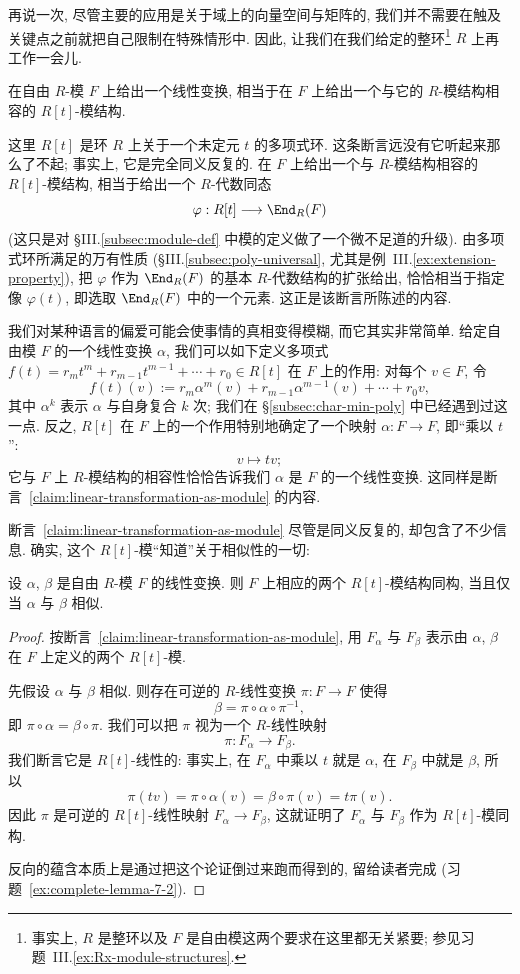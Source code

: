 再说一次, 尽管主要的应用是关于域上的向量空间与矩阵的, 我们并不需要在触及关键点之前就把自己限制在特殊情形中. 因此, 让我们在我们给定的整环\footnote{事实上, $R$ 是整环以及 $F$ 是自由模这两个要求在这里都无关紧要; 参见习题~III.\ref{ex:Rx-module-structures}.} $R$ 上再工作一会儿.

\begin{claim}\label{claim:linear-transformation-as-module}
在自由 $R$-模 $F$ 上给出一个线性变换, 相当于在 $F$ 上给出一个与它的 $R$-模结构相容的 $R[t]$-模结构.
\end{claim}

这里 $R[t]$ 是环 $R$ 上关于一个未定元 $t$ 的多项式环. 这条断言远没有它听起来那么了不起; 事实上, 它是完全同义反复的. 在 $F$ 上给出一个与 $R$-模结构相容的 $R[t]$-模结构, 相当于给出一个 $R$-代数同态
\[
\varphi:R[t]\longrightarrow\End_R(F)
\]
(这只是对 §III.\ref{subsec:module-def} 中模的定义做了一个微不足道的升级). 由多项式环所满足的万有性质 (§III.\ref{subsec:poly-universal}, 尤其是例~III.\ref{ex:extension-property}), 把 $\varphi$ 作为 $\End_R(F)$ 的基本 $R$-代数结构的扩张给出, 恰恰相当于指定像 $\varphi(t)$, 即选取 $\End_R(F)$ 中的一个元素. 这正是该断言所陈述的内容.

我们对某种语言的偏爱可能会使事情的真相变得模糊, 而它其实非常简单. 给定自由模 $F$ 的一个线性变换 $\alpha$, 我们可以如下定义多项式 $f(t)=r_mt^m+r_{m-1}t^{m-1}+\cdots+r_0\in R[t]$ 在 $F$ 上的作用: 对每个 $v\in F$, 令
\[
f(t)(v):=r_m\alpha^m(v)+r_{m-1}\alpha^{m-1}(v)+\cdots+r_0v,
\]
其中 $\alpha^k$ 表示 $\alpha$ 与自身复合 $k$ 次; 我们在 §\ref{subsec:char-min-poly} 中已经遇到过这一点. 反之, $R[t]$ 在 $F$ 上的一个作用特别地确定了一个映射 $\alpha:F\to F$, 即``乘以 $t$'':
\[
v\longmapsto tv;
\]
它与 $F$ 上 $R$-模结构的相容性恰恰告诉我们 $\alpha$ 是 $F$ 的一个线性变换. 这同样是断言~\ref{claim:linear-transformation-as-module} 的内容.

断言~\ref{claim:linear-transformation-as-module} 尽管是同义反复的, 却包含了不少信息. 确实, 这个 $R[t]$-模``知道''关于相似性的一切:

\begin{lemma}\label{lem:similarity-iso-modules}
设 $\alpha$, $\beta$ 是自由 $R$-模 $F$ 的线性变换. 则 $F$ 上相应的两个 $R[t]$-模结构同构, 当且仅当 $\alpha$ 与 $\beta$ 相似.
\end{lemma}

\begin{proof}
按断言~\ref{claim:linear-transformation-as-module}, 用 $F_\alpha$ 与 $F_\beta$ 表示由 $\alpha$, $\beta$ 在 $F$ 上定义的两个 $R[t]$-模.

先假设 $\alpha$ 与 $\beta$ 相似. 则存在可逆的 $R$-线性变换 $\pi:F\to F$ 使得
\[
\beta=\pi\circ\alpha\circ\pi^{-1},
\]
即 $\pi\circ\alpha=\beta\circ\pi$. 我们可以把 $\pi$ 视为一个 $R$-线性映射
\[
\pi:F_\alpha\longrightarrow F_\beta.
\]
我们断言它是 $R[t]$-线性的: 事实上, 在 $F_\alpha$ 中乘以 $t$ 就是 $\alpha$, 在 $F_\beta$ 中就是 $\beta$, 所以
\[
\pi(tv)=\pi\circ\alpha(v)=\beta\circ\pi(v)=t\pi(v).
\]
因此 $\pi$ 是可逆的 $R[t]$-线性映射 $F_\alpha\to F_\beta$, 这就证明了 $F_\alpha$ 与 $F_\beta$ 作为 $R[t]$-模同构.

反向的蕴含本质上是通过把这个论证倒过来跑而得到的, 留给读者完成 (习题~\ref{ex:complete-lemma-7-2}).
\end{proof}

